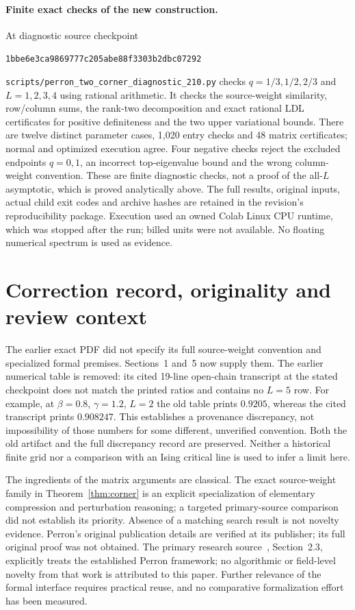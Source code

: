 \documentclass[11pt]{article}
\newcommand{\diagpin}{1bbe6e3ca9869777c205abe88f3303b2dbc07292}
\begin{document}
\paragraph{Finite exact checks of the new construction.}
At diagnostic source checkpoint
\begin{center}\small\texttt{\diagpin}\end{center}
\nolinkurl{scripts/perron_two_corner_diagnostic_210.py} checks $q=1/3,1/2,2/3$
and $L=1,2,3,4$ using rational arithmetic. It checks the source-weight
similarity, row/column sums, the rank-two decomposition and exact rational
LDL certificates for positive definiteness and the two upper variational
bounds. There are twelve distinct parameter cases, 1,020 entry checks and
48 matrix certificates; normal and optimized execution agree. Four negative
checks reject the excluded endpoints $q=0,1$, an incorrect top-eigenvalue bound
and the wrong column-weight convention. These are finite diagnostic checks,
not a proof of the all-$L$ asymptotic, which is proved analytically above.
The full results, original inputs, actual child exit codes and archive hashes
are retained in the revision's reproducibility package. Execution used an
owned Colab Linux CPU runtime, which was stopped after the run; billed units
were not available. No floating numerical spectrum is used as evidence.

\section{Correction record, originality and review context}
The earlier exact PDF did not specify its full source-weight convention and
specialized formal premises. Sections~1 and~5 now supply them. The earlier
numerical table is removed: its cited 19-line open-chain transcript at the
stated checkpoint does not match the printed ratios and contains no $L=5$
row. For example, at $\beta=0.8$, $\gamma=1.2$, $L=2$ the old table prints
$0.9205$, whereas the cited transcript prints $0.908247$. This establishes a
provenance discrepancy, not impossibility of those numbers for some different,
unverified convention. Both the old artifact and the full discrepancy record
are preserved. Neither a historical finite grid nor a comparison with an Ising
critical line is used to infer a limit here.

The ingredients of the matrix arguments are classical. The exact source-weight
family in Theorem~\ref{thm:corner} is an explicit specialization of elementary
compression and perturbation reasoning; a targeted primary-source comparison
did not establish its priority. Absence of a matching search result is not
novelty evidence. Perron's original publication details are verified at its
publisher; its full original proof was not obtained. The primary research
source~\cite{Ahmadinejad}, Section~2.3, explicitly treats the established Perron
framework; no algorithmic or field-level novelty from that work is attributed
to this paper. Further relevance of the formal interface requires practical
reuse, and no comparative formalization effort has been measured.
\end{document}
